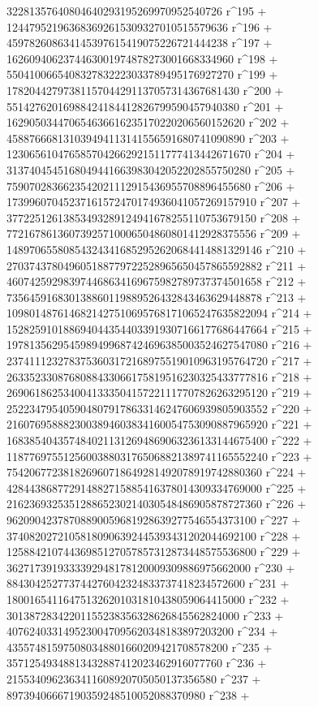        32281357640804640293195269970952540726 r^195 + 
       124479521963683692615309327010515579636 r^196 + 
       459782608634145397615419075226721444238 r^197 + 
       1626094062374463001974878273001668334960 r^198 + 
       5504100665408327832223033789495176927270 r^199 + 
       17820442797381157044291137057314367681430 r^200 + 
       55142762016988424184412826799590457940380 r^201 + 
       162905034470654636616235170220206560152620 r^202 + 
       458876668131039494113141556591680741090890 r^203 + 
       1230656104765857042662921511777413442671670 r^204 + 
       3137404545168049441663983042052202855750280 r^205 + 
       7590702836623542021112915436955708896455680 r^206 + 
       17399607045237161572470174936041057269157910 r^207 + 
       37722512613853493289124941678255110753679150 r^208 + 
       77216786136073925710006504860801412928375556 r^209 + 
       148970655808543243416852952620684414881329146 r^210 + 
       270374378049605188779722528965650457865592882 r^211 + 
       460742592983974468634169675982789737374501658 r^212 + 
       735645916830138860119889526432843463629448878 r^213 + 
       1098014876146821427510695768171065247635822094 r^214 + 
       1528259101886940443544033919307166177686447664 r^215 + 
       1978135629545989499687424696385003524627547080 r^216 + 
       2374111232783753603172168975519010963195764720 r^217 + 
       2633523308768088433066175819516230325433777816 r^218 + 
       2690618625340041333504157221117707826263295120 r^219 + 
       2522347954059048079178633146247606939805903552 r^220 + 
       2160769588823003894603834160054753090887965920 r^221 + 
       1683854043574840211312694869063236133144675400 r^222 + 
       1187769755125600388031765068821389741165552240 r^223 + 
       754206772381826960718649281492078919742880360 r^224 + 
       428443868772914882715885416378014309334769000 r^225 + 
       216236932535128865230214030548486905878727360 r^226 + 
       96209042378708890059681928639277546554373100 r^227 + 
       37408202721058180906392445393431202044692100 r^228 + 
       12588421074436985127057857312873448575536800 r^229 + 
       3627173919333392948178120009309886975662000 r^230 + 
       884304252773744276042324833737418234572600 r^231 + 
       180016541164751326201031810438059064415000 r^232 + 
       30138728342201155238356328626845562824000 r^233 + 
       4076240331495230047095620348183897203200 r^234 + 
       435574815975080348801660209421708578200 r^235 + 
       35712549348813432887412023462916077760 r^236 + 
       2155340962363411608920705050137356580 r^237 + 
       89739406667190359248510052088370980 r^238 + 
